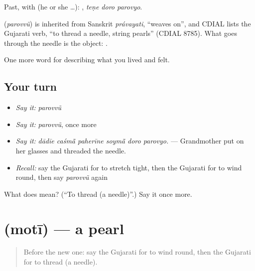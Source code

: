 Past, with  (he or she …):   , \emph{teṇe doro parovyo}.

\begin{cousinweb}
\textbf{} (\emph{parovvũ}) is inherited from Sanskrit \emph{právayati}, \textquotedblleft{}weaves on\textquotedblright{}, and CDIAL lists the Gujarati verb, \textquotedblleft{}to thread a needle, string pearls\textquotedblright{} (CDIAL 8785). What goes through the needle is the object: \textbf{ }.
\end{cousinweb}

\begin{grammarlens}[title={What you've built}]
One more word for describing what you lived and felt.
\end{grammarlens}

\subsection*{Your turn}
\begin{itemize}
\raggedright
  \item \emph{Say it:} \emph{parovvũ}
  \item \emph{Say it:} \emph{parovvũ}, once more
  \item \emph{Say it:} \emph{dādīe caśmā̃ paherīne soymā̃ doro parovyo.} — Grandmother put on her glasses and threaded the needle.
  \item \emph{Recall:} say the Gujarati for to stretch tight, then the Gujarati for to wind round, then say \emph{parovvũ} again
\end{itemize}

\begin{tcolorbox}[breakable,colback=teal!4,colframe=teal!35!black,title={Before you move on}]
What does  mean? (\textquotedblleft{}To thread (a needle)\textquotedblright{}.) Say it once more.
\end{tcolorbox}
\section[\texorpdfstring{\gu{મોતી} (motī)}{મોતી (motī)}]{ (motī) — a pearl}

\label{lesson:GU-C507-moti}



\begin{quote}
Before the new one: say the Gujarati for to wind round, then the Gujarati for to thread (a needle).
\end{quote}

